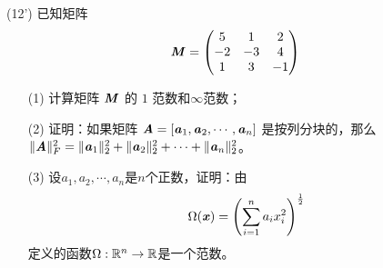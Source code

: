 \documentclass[12pt,a4paper,openany,twoside]{ctexbook}
\begin{document}
\begin{exercise}(12')
	已知矩阵\[ \boldsymbol{\mathit{M}} = \begin{pmatrix}
		5&1&2\\
		-2&-3&4\\
		1&3&-1\\
	\end{pmatrix}
	\]
	\begin{itemize}
		\item [(1)] 计算矩阵 $\boldsymbol{\mathit{M}}$ 的 $1$ 范数和$\infty$范数；
		\item [(2)] 证明：如果矩阵 $\boldsymbol{\mathit{A}} = [\boldsymbol{\mathit{a}}_1, \boldsymbol{\mathit{a}}_2, \cdots, \boldsymbol{\mathit{a}}_n]$ 是按列分块的，那么 $\|\boldsymbol{\mathit{A}}\|_F^2 = \|\boldsymbol{\mathit{a}}_1\|_2^2 + \|\boldsymbol{\mathit{a}}_2\|_2^2 + \cdots + \|\boldsymbol{\mathit{a}}_n\|_2^2$。
		\item [(3)] 设$ a_1,a_2,\cdots,a_n $是$ n $个正数，证明：由
		$$ \Omega(\boldsymbol{\mathit{x}})=\left(\sum_{i=1}^na_ix_i^2\right)^{\frac{1}{2}} $$
		定义的函数$ \Omega: \mathbb{R}^n\to\mathbb{R} $是一个范数。
	\end{itemize}
\end{exercise}
%	
%	
\end{document}

